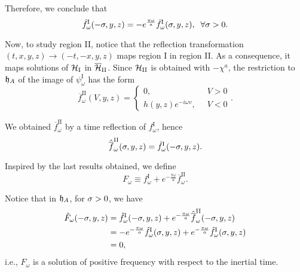 Therefore, we conclude that
\begin{equation}
    \hat{f}^{\text{I}}_\omega(-\sigma,y,z)=-e^{\frac{\pi\omega}{a}}\hat{f}^{\text{I}}_\omega(\sigma,y,z),\;\;\forall\sigma>0.
\end{equation}

Now, to study region II, notice that the reflection transformation \((t,x,y,z)\to(-t,-x,y,z)\) maps region I in region II. As a consequence, it maps solutions of \({\mathcal{H}}_\text{I}\) in \(\overline{{\mathcal{H}}}_{\text{II}}\). Since \({\mathcal{H}}_{\text{II}}\) is obtained with \(-\chi^a\), the restriction to \({\mathfrak{h}}_A\) of the image of \(\psi^{\text{I}}_\omega\) has the form
\begin{equation}
    \overline{f}^{\text{II}}_\omega(V,y,z)=
    \begin{cases}
        0,\;\;&V>0\\
        h(y,z)e^{-i\omega v},\;\;&V<0
    \end{cases}.
\end{equation}

We obtained \(\overline{f}^{\text{II}}_\omega\) by a time reflection of \(f^{\text{I}}_\omega\), hence
\begin{equation}
    \hat{\overline{f}}^{\text{II}}_\omega(\sigma,y,z)=\hat{f}^{\text{I}}_\omega(-\sigma,y,z).
\end{equation}

Inspired by the last results obtained, we define
\begin{equation}
    F_\omega\equiv f^{\text{I}}_\omega+e^{-\frac{\pi\omega}{a}}\overline{f}^{\text{II}}_\omega.
\end{equation}

Notice that in \({\mathfrak{h}}_A\), for \(\sigma>0\), we have
\begin{subequations}
    \begin{align}
        \hat{F}_\omega(-\sigma,y,z)&=\hat{f}^{\text{I}}_\omega(-\sigma,y,z)+e^{-\frac{\pi\omega}{a}}\hat{\overline{f}}^{\text{II}}_\omega(-\sigma,y,z)\\
        &=-e^{-\frac{\pi\omega}{a}}\hat{f}^{\text{I}}_\omega(\sigma,y,z)+e^{-\frac{\pi\omega}{a}}\hat{f}^{\text{I}}_\omega(\sigma,y,z)\\
        &=0,
    \end{align}
\end{subequations}
i.e., \(F_\omega\) is a solution of positive frequency with respect to the inertial time.

